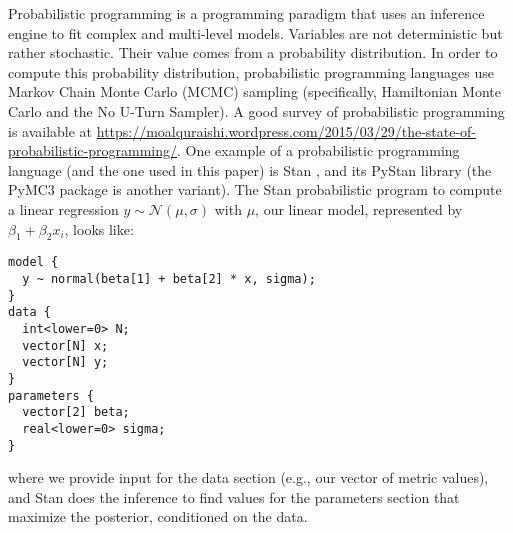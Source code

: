 \documentclass[sigconf,natbib=false]{acmart}
\begin{document}
Probabilistic programming is a programming paradigm that uses an inference engine to fit complex and multi-level models. Variables are not deterministic but rather stochastic. Their value comes from a probability distribution. In order to compute this probability distribution, probabilistic programming languages use Markov Chain Monte Carlo (MCMC) sampling (specifically, Hamiltonian Monte Carlo and the No U-Turn Sampler). 
A good survey of probabilistic programming is available at \url{https://moalquraishi.wordpress.com/2015/03/29/the-state-of-probabilistic-programming/}. One example of a probabilistic programming language (and the one used in this paper) is Stan \cite{Carpenter2017}, and its PyStan library (the PyMC3 package is another variant). The Stan probabilistic program to compute a linear regression $y \sim \mathcal{N}(\mu,\sigma)$ with $\mu$, our linear model, represented by $\beta_1 + \beta_2 x_i$, looks like:

\begin{verbatim}
model {
  y ~ normal(beta[1] + beta[2] * x, sigma);
}
data {
  int<lower=0> N; 
  vector[N] x;
  vector[N] y;
}
parameters {
  vector[2] beta;
  real<lower=0> sigma;
} 
\end{verbatim}

where we provide input for the data section (e.g., our vector of metric values), and Stan does the inference to find values for the parameters section that maximize the posterior, conditioned on the data. %
\end{document}
